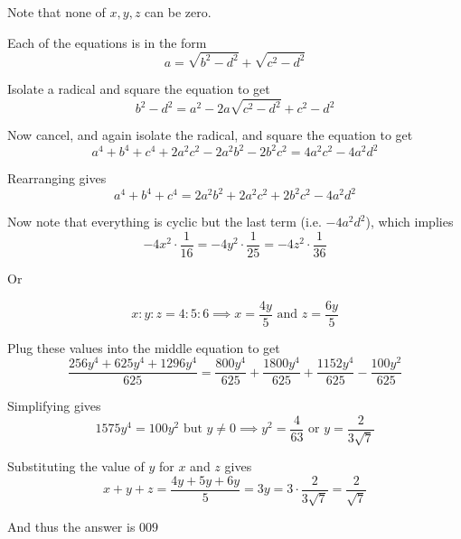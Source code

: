 \begin{enumerate}
Note that none of $x,y,z$ can be zero.

 Each of the equations is in the form 
 \[a=\sqrt{b^2-d^2}+\sqrt{c^2-d^2}\]

 Isolate a radical and square the equation to get 
 \[b^2-d^2=a^2-2a\sqrt{c^2-d^2}+c^2-d^2\] 

 Now cancel, and again isolate the radical, and square the equation to get 
 \[a^4+b^4+c^4+2a^2c^2-2a^2b^2-2b^2c^2=4a^2c^2-4a^2d^2\]

 Rearranging gives 
 \[a^4+b^4+c^4=2a^2b^2+2a^2c^2+2b^2c^2-4a^2d^2\]

 Now note that everything is cyclic but the last term (i.e. $-4a^2d^2$), which implies 
 \[-4x^2\cdot\frac1{16}=-4y^2\cdot\frac1{25}=-4z^2\cdot\frac1{36}\]

 Or

 
 \[x: y: z=4: 5: 6 \implies x=\frac{4y}5 \textrm{ and } z=\frac{6y}5\]

 Plug these values into the middle equation to get 
 \[\frac{256y^4+625y^4+1296y^4}{625}=\frac{800y^4}{625}+\frac{1800y^4}{625}+\frac{1152y^4}{625}-\frac{100y^2}{625}\]

 Simplifying gives 
 \[1575y^4=100y^2 \textrm{ but } y \neq 0 \implies y^2=\frac4{63} \textrm{ or } y=\frac2{3\sqrt7}\]

 Substituting the value of $y$ for $x$ and $z$ gives
 \[x+y+z = \frac{4y+5y+6y}5 = 3y = 3 \cdot \frac{2}{3\sqrt7} = \frac{2}{\sqrt7}\] 

 And thus the answer is $\boxed{009}$



\end{enumerate}